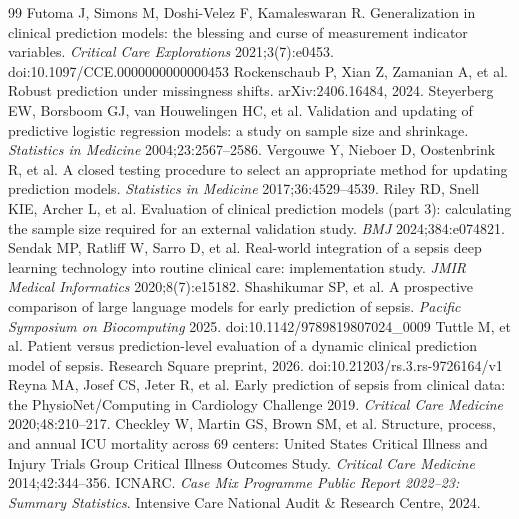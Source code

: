 \documentclass[11pt,a4paper]{article}
\begin{document}
\begin{thebibliography}{99}\small
\setlength{\itemsep}{0.1em}
 Futoma J, Simons M, Doshi-Velez F, Kamaleswaran R. Generalization in clinical prediction models: the blessing and curse of measurement indicator variables. \emph{Critical Care Explorations} 2021;3(7):e0453. doi:10.1097/CCE.0000000000000453
 Rockenschaub P, Xian Z, Zamanian A, et al. Robust prediction under missingness shifts. arXiv:2406.16484, 2024.
 Steyerberg EW, Borsboom GJ, van Houwelingen HC, et al. Validation and updating of predictive logistic regression models: a study on sample size and shrinkage. \emph{Statistics in Medicine} 2004;23:2567--2586.
 Vergouwe Y, Nieboer D, Oostenbrink R, et al. A closed testing procedure to select an appropriate method for updating prediction models. \emph{Statistics in Medicine} 2017;36:4529--4539.
 Riley RD, Snell KIE, Archer L, et al. Evaluation of clinical prediction models (part 3): calculating the sample size required for an external validation study. \emph{BMJ} 2024;384:e074821.
 Sendak MP, Ratliff W, Sarro D, et al. Real-world integration of a sepsis deep learning technology into routine clinical care: implementation study. \emph{JMIR Medical Informatics} 2020;8(7):e15182.
 Shashikumar SP, et al. A prospective comparison of large language models for early prediction of sepsis. \emph{Pacific Symposium on Biocomputing} 2025. doi:10.1142/9789819807024\_0009
 Tuttle M, et al. Patient versus prediction-level evaluation of a dynamic clinical prediction model of sepsis. Research Square preprint, 2026. doi:10.21203/rs.3.rs-9726164/v1
 Reyna MA, Josef CS, Jeter R, et al. Early prediction of sepsis from clinical data: the PhysioNet/Computing in Cardiology Challenge 2019. \emph{Critical Care Medicine} 2020;48:210--217.
 Checkley W, Martin GS, Brown SM, et al. Structure, process, and annual ICU mortality across 69 centers: United States Critical Illness and Injury Trials Group Critical Illness Outcomes Study. \emph{Critical Care Medicine} 2014;42:344--356.
 ICNARC. \emph{Case Mix Programme Public Report 2022--23: Summary Statistics}. Intensive Care National Audit \& Research Centre, 2024.
\end{thebibliography}
\end{document}
